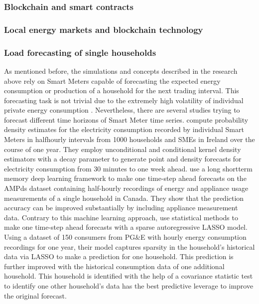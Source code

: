 \subsubsection{Blockchain and smart contracts}



\subsubsection{Local energy markets and blockchain technology}



\subsubsection{Load forecasting of single households}
As mentioned before, the simulations and concepts described in the research above rely on Smart Meters capable of forecasting the expected energy consumption or production of a household for the next trading interval. This forecasting task is not trivial due to the extremely high volatility of individual private energy consumption \citep{Wang:2018}. Nevertheless, there are several studies trying to forecast different time horizons of Smart Meter time series.
\citet{Arora:2016} compute probability density estimates for the electricity consumption recorded by individual Smart Meters in halfhourly intervals from 1000 households and SMEs in Ireland over the course of one year. They employ unconditional and conditional kernel density estimators with a decay parameter to generate point and density forecasts for electricity consumption from 30 minutes to one week ahead.
\citet{Kong:2018} use a long shortterm memory deep learning framework to make one time-step ahead forecasts on the AMPds dataset containing half-hourly recordings of energy and appliance usage measurements of a single household in Canada. They show that the prediction accuracy can be improved substantially by including appliance measurement data.
Contrary to this machine learning approach, \citet{Li:2017} use statistical methods to make one time-step ahead forecasts with a sparse autoregressive LASSO model. Using a dataset of 150 consumers from PG\&E with hourly energy consumption recordings for one year, their model captures sparsity in the household’s historical data via LASSO to make a prediction for one household. This prediction is further improved with the historical consumption data of one additional household. This household is identified with the help of a covariance statistic test to identify one other household’s data has the best predictive leverage to improve the original forecast.
